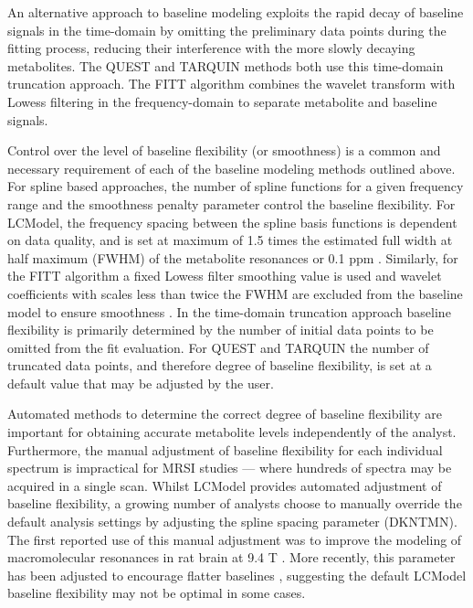 \documentclass[num-refs]{wiley-article}
\begin{document}
An alternative approach to baseline modeling exploits the rapid decay of baseline signals in the time-domain by omitting the preliminary data points during the fitting process, reducing their interference with the more slowly decaying metabolites. The QUEST \cite{Ratiney2005} and TARQUIN \cite{Wilson2011} methods both use this time-domain truncation approach. The FITT \cite{Young1998} algorithm combines the wavelet transform with Lowess filtering in the frequency-domain to separate metabolite and baseline signals.

Control over the level of baseline flexibility (or smoothness) is a common and necessary requirement of each of the baseline modeling methods outlined above. For spline based approaches, the number of spline functions for a given frequency range and the smoothness penalty parameter control the baseline flexibility. For LCModel, the frequency spacing between the spline basis functions is dependent on data quality, and is set at maximum of 1.5 times the estimated full width at half maximum (FWHM) of the metabolite resonances or 0.1 ppm \cite{Provencher1993}. Similarly, for the FITT algorithm a fixed Lowess filter smoothing value is used and wavelet coefficients with scales less than twice the FWHM are excluded from the baseline model to ensure smoothness \cite{Young1998}. In the time-domain truncation approach baseline flexibility is primarily determined by the number of initial data points to be omitted from the fit evaluation. For QUEST and TARQUIN the number of truncated data points, and therefore degree of baseline flexibility, is set at a default value that may be adjusted by the user. 

Automated methods to determine the correct degree of baseline flexibility are important for obtaining accurate metabolite levels independently of the analyst. Furthermore, the manual adjustment of baseline flexibility for each individual spectrum is impractical for MRSI studies --- where hundreds of spectra may be acquired in a single scan. Whilst LCModel provides automated adjustment of baseline flexibility, a growing number of analysts choose to manually override the default analysis settings by adjusting the spline spacing parameter (DKNTMN). The first reported use of this manual adjustment was to improve the modeling of macromolecular resonances in rat brain at 9.4 T \cite{Pfeuffer1999}. More recently, this parameter has been adjusted to encourage flatter baselines \cite{Deelchand2016,Terpstra2010,Marjanska2018}, suggesting the default LCModel baseline flexibility may not be optimal in some cases.
\end{document}
